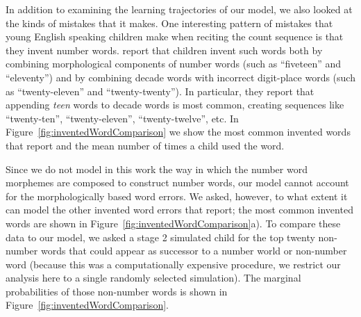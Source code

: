 \documentclass[10pt,letterpaper]{article}
\begin{document}
In addition to examining the learning trajectories of our model, we
also looked at the kinds of mistakes that it makes. One interesting
pattern of mistakes that young English speaking children make when
reciting the count sequence is that they invent number
words. \citeauthor{FusRicBriar1982} report that children invent such
words both by combining morphological components of number words (such
as ``fiveteen'' and ``eleventy'') and by combining decade words with
incorrect digit-place words (such as ``twenty-eleven'' and
``twenty-twenty''). In particular, they report that appending
\emph{teen} words to decade words is most common, creating sequences
like ``twenty-ten'', ``twenty-eleven'', ``twenty-twelve'', etc.
In Figure~\ref{fig:inventedWordComparison} we show the most common invented
words that \citeauthor{FusRicBriar1982} report and the mean number of
times a child used the word. 

Since we do not model in this work the way in which the number word
morphemes are composed to construct number words, our model cannot
account for the morphologically based word errors. We asked, however,
to what extent it can model the other invented word errors that
\citeauthor{FusRicBriar1982} report; the most common invented words
are shown in Figure~\ref{fig:inventedWordComparison}a). To compare
these data to our model, we asked a stage 2 simulated child for the
top twenty non-number words that could appear as successor to a number
world or non-number word (because this was a computationally expensive
procedure, we restrict our analysis here to a single randomly selected
simulation). The marginal probabilities of those non-number words is
shown in Figure~\ref{fig:inventedWordComparison}.



\end{document}
